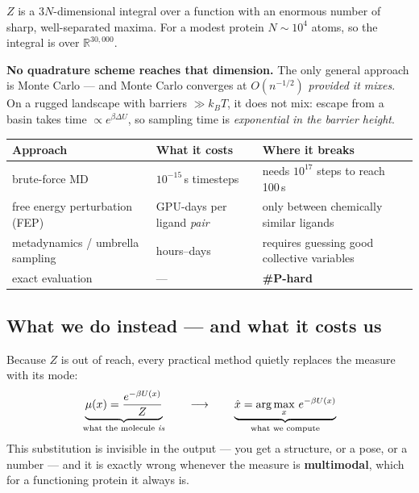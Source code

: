 \begin{tier3}[title={Why it is genuinely hard, not merely expensive}]
$Z$ is a $3N$-dimensional integral over a function with an enormous number of sharp, well-separated
maxima. For a modest protein $N\sim10^4$ atoms, so the integral is over $\mathbb{R}^{30{,}000}$.

\textbf{No quadrature scheme reaches that dimension.} The only general approach is Monte Carlo ---
and Monte Carlo converges at $O(n^{-1/2})$ \emph{provided it mixes}. On a rugged landscape with
barriers $\gg k_BT$, it does not mix: escape from a basin takes time $\propto e^{\beta\Delta U}$, so
sampling time is \emph{exponential in the barrier height}.

\begin{center}\small
\begin{tabular}{@{}l l l@{}}
\toprule
\rowcolor{alert!12}
\textbf{Approach} & \textbf{What it costs} & \textbf{Where it breaks}\\
\midrule
brute-force MD & $10^{-15}$\,s timesteps & needs $10^{17}$ steps to reach 100\,s\\
free energy perturbation (FEP) & GPU-days per ligand \emph{pair} & only between chemically similar ligands\\
metadynamics / umbrella sampling & hours--days & requires guessing good collective variables\\
\rowcolor{alert!7}
exact evaluation & --- & \textbf{\#P-hard}\\
\bottomrule
\end{tabular}
\end{center}
\end{tier3}

\subsection{What we do instead --- and what it costs us}

Because $Z$ is out of reach, every practical method quietly replaces the measure with its mode:
\[
\underbrace{\mu(x)=\frac{e^{-\beta U(x)}}{Z}}_{\text{what the molecule \emph{is}}}
\qquad\longrightarrow\qquad
\underbrace{\hat{x}=\arg\max_x\, e^{-\beta U(x)}}_{\text{what we compute}}
\]
This substitution is invisible in the output --- you get a structure, or a pose, or a number --- and
it is exactly wrong whenever the measure is \textbf{multimodal}, which for a functioning protein it
always is.

